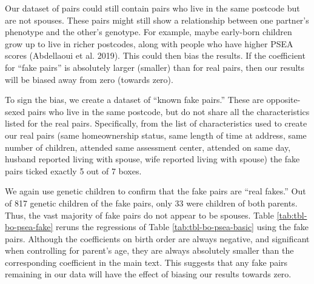 \documentclass[
]{article}
\begin{document}
Our dataset of pairs could still contain pairs who live in the same
postcode but are not spouses. These pairs might still show a
relationship between one partner's phenotype and the other's genotype.
For example, maybe early-born children grow up to live in richer
postcodes, along with people who have higher PSEA scores
(Abdellaoui et al. 2019). This could then bias the results. If the
coefficient for ``fake pairs'' is absolutely larger (smaller) than for
real pairs, then our results will be biased away from zero (towards
zero).

To sign the bias, we create a dataset of ``known fake pairs.'' These are
opposite-sexed pairs who live in the same postcode, but do not share all
the characteristics listed for the real pairs. Specifically, from the
list of characteristics used to create our real pairs (same
homeownership status, same length of time at address, same number of
children, attended same assessment center, attended on same day, husband
reported living with spouse, wife reported living with spouse) the fake
pairs ticked exactly 5 out of 7 boxes.

We again use genetic children to confirm that the fake pairs are ``real
fakes.'' Out of 817 genetic children of the fake pairs, only
33 were children of both parents. Thus, the vast majority of
fake pairs do not appear to be spouses. Table
\ref{tab:tbl-bo-psea-fake} reruns the regressions of Table
\ref{tab:tbl-bo-psea-basic} using the fake pairs. Although the
coefficients on birth order are always negative, and significant
when controlling for parent's age, they are always absolutely smaller than the
corresponding coefficient in the main text. This suggests that
any fake pairs remaining in our data will have the effect of biasing our
results towards zero.

 
  \providecommand{\huxb}[2]{\arrayrulecolor[RGB]{#1}\global\arrayrulewidth=#2pt}
  \providecommand{\huxvb}[2]{\color[RGB]{#1}\vrule width #2pt}
  \providecommand{\huxtpad}[1]{\rule{0pt}{#1}}
  \providecommand{\huxbpad}[1]{\rule[-#1]{0pt}{#1}}
\end{document}

